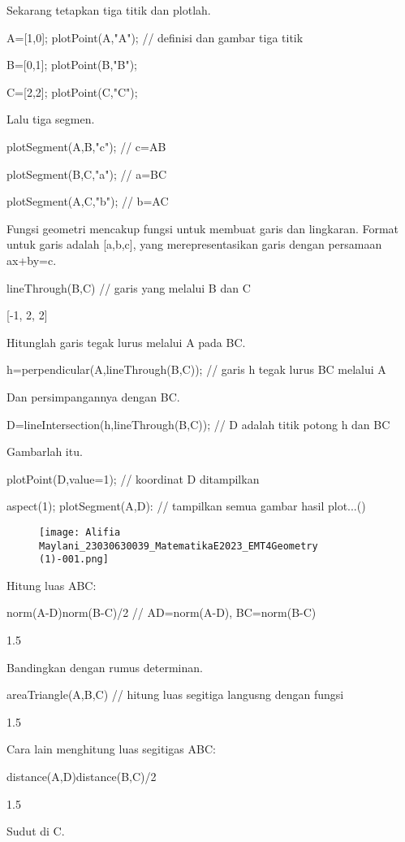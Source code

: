 \documentclass{article}
\begin{document}
Sekarang tetapkan tiga titik dan plotlah.


\>A=[1,0]; plotPoint(A,"A"); // definisi dan gambar tiga titik

\>B=[0,1]; plotPoint(B,"B");

\>C=[2,2]; plotPoint(C,"C");


Lalu tiga segmen.


\>plotSegment(A,B,"c"); // c=AB

\>plotSegment(B,C,"a"); // a=BC

\>plotSegment(A,C,"b"); // b=AC


Fungsi geometri mencakup fungsi untuk membuat garis dan lingkaran.
Format untuk garis adalah [a,b,c], yang merepresentasikan garis dengan
persamaan ax+by=c.


\>lineThrough(B,C) // garis yang melalui B dan C


    [-1,  2,  2]

Hitunglah garis tegak lurus melalui A pada BC.


\>h=perpendicular(A,lineThrough(B,C)); // garis h tegak lurus BC melalui A


Dan persimpangannya dengan BC.


\>D=lineIntersection(h,lineThrough(B,C)); // D adalah titik potong h dan BC


Gambarlah itu.


\>plotPoint(D,value=1); // koordinat D ditampilkan

\>aspect(1); plotSegment(A,D): // tampilkan semua gambar hasil plot...()


\begin{figure}
    \centering
    \texttt{[image: Alifia Maylani\_23030630039\_MatematikaE2023\_EMT4Geometry (1)-001.png]}
    \caption{}
    \label{fig:enter-label}
\end{figure}

Hitung luas ABC:


\>norm(A-D)\*norm(B-C)/2 // AD=norm(A-D), BC=norm(B-C)


    1.5

Bandingkan dengan rumus determinan.


\>areaTriangle(A,B,C) // hitung luas segitiga langusng dengan fungsi


    1.5

Cara lain menghitung luas segitigas ABC:


\>distance(A,D)\*distance(B,C)/2


    1.5

Sudut di C.
\end{document}
